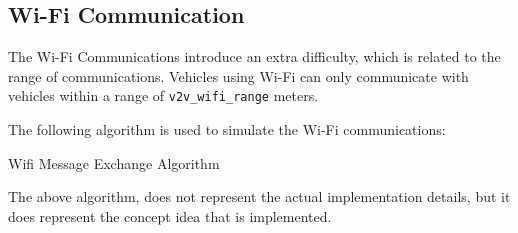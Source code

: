\subsection{Wi-Fi Communication}

The Wi-Fi Communications introduce an extra difficulty, which is related to the range of communications. Vehicles using Wi-Fi can only communicate with vehicles within a range of \texttt{v2v\_wifi\_range} meters.

The following algorithm is used to simulate the Wi-Fi communications:

\begin{algorithm}[H]

 \caption{Wifi Message Exchange Algorithm}
\end{algorithm}

The above algorithm, does not represent the actual implementation details, but it does represent the concept idea that is implemented.